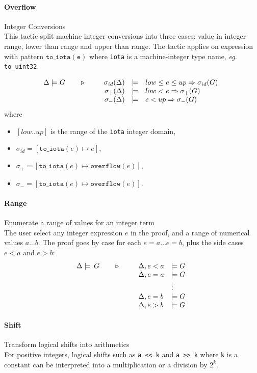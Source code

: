 \paragraph{Overflow} Integer Conversions \\
This tactic split machine integer conversions into three cases: value in integer
range, lower than range and upper than range. The tactic applies on expression
with pattern $\mathtt{to\_iota(e)}$ where \texttt{iota} is a machine-integer type
name, \emph{eg.} \texttt{to\_uint32}.

\[\TACTIC{\Delta\models G}{%
\begin{array}[t]{rcl}
\sigma_{id}(\Delta) & \models & low \leq e \leq up \Rightarrow \sigma_{id}(G) \\
\sigma_{+}(\Delta) & \models & low < e \Rightarrow \sigma_{+}(G) \\
\sigma_{-}(\Delta) & \models & e < up \Rightarrow \sigma_{-}(G)
\end{array}
}\]
where
\begin{itemize}
  \item $[low..up]$ is the range of the \texttt{iota} integer domain,
  \item $\sigma_{id} = [ \mathtt{to\_iota}(e) \mapsto e ]$,
  \item $\sigma_{+}  = [ \mathtt{to\_iota}(e) \mapsto \mathtt{overflow}(e) ]$,
  \item $\sigma_{-}  = [ \mathtt{to\_iota}(e) \mapsto \mathtt{overflow}(e) ]$.
\end{itemize}

\paragraph{Range} Enumerate a range of values for an integer term\\
The user select any integer expression $e$ in the proof, and a range of numerical values $a\ldots b$. The proof goes by case for each $e=a\ldots e=b$, plus the side cases $e<a$ and $e>b$:
$$\TACTIC{\Delta\models\,G}{%
\begin{array}[t]{ll}
\Delta,e<a &\models G \\
\Delta,e=a &\models G \\
&\vdots \\
\Delta,e=b &\models G \\
\Delta,e>b &\models G
\end{array}} $$

\paragraph{Shift} Transform logical shifts into arithmetics\\
For positive integers, logical shifts such as \lstinline{a << k}
and \lstinline{a >> k} where \lstinline$k$ is a constant can be interpreted into a multiplication or a division by $2^k$.

